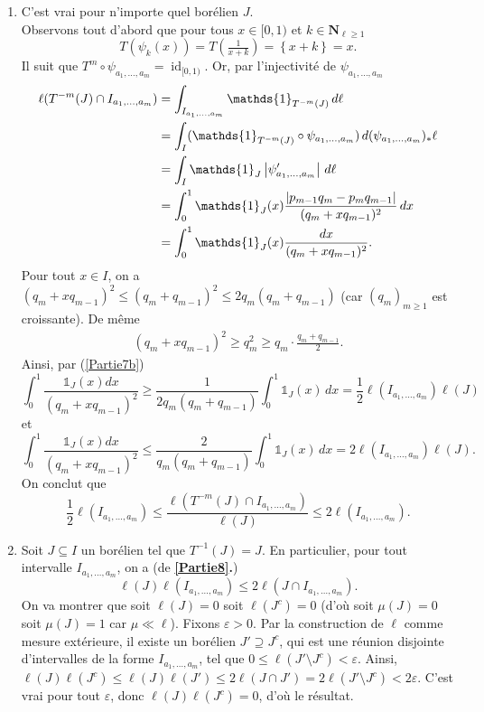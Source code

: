\documentclass[french]{article}
\theoremstyle{definition}
\newcommand{\set}[1]{\left\{#1\right\}}
\newcommand{\tuple}[1]{\left(#1\right)}
\newcommand{\abs}[1]{\left|#1\right|}
\newcommand{\indi}{\mathds{1}}
\newcommand{\Nbb}{\mathbf{N}}
\newcommand{\id}{\operatorname{id}}
\begin{document}
\begin{enumerate}
    \item \label{Partie8}
        C'est vrai pour n'importe quel bor\'elien $J$.\\
        Observons tout d'abord que pour tous $x \in [0,1)$ et $k \in \Nbb_{\ell \ge 1}$
            $$T(\psi_k(x)) = T\tuple{\tfrac{1}{x + k}} = \set{x + k} = x.$$
        Il suit que $T^m \circ \psi_{a_1,\ldots,a_m} = \id_{[0,1)}$. Or, par l'injectivit\'e de $\psi_{a_1,\ldots,a_m}$
            \begin{align*}
                \allowdisplaybreaks
                \ell(T^{-m}(J) \cap I_{a_1,\ldots,a_m}) & = \int_{I_{a_1,\ldots,a_m}} \indi_{T^{-m}(J)}\,d\ell \\
                & = \int_I (\indi_{T^{-m}(J)} \circ \psi_{a_1,\ldots,a_m}) \,d(\psi_{a_1,\ldots,a_m})_\ast \ell \\
                & = \int_I \indi_{J} \abs{\psi'_{a_1,\ldots,a_m}} \,d\ell \\
                & = \int_0^1 \indi_{J}(x) \frac{|p_{m-1}q_m - p_mq_{m-1}|}{(q_m + xq_{m-1})^2}\,dx\\
                & = \int_0^1 \indi_{J}(x) \frac{dx}{(q_m + xq_{m-1})^2}.
            \end{align*}
        Pour tout $x \in I$, on a $(q_m + xq_{m-1})^2 \le (q_m + q_{m-1})^2 \le 2q_m(q_m + q_{m-1})$ (car $(q_m)_{m \ge 1}$ est croissante).
        De m\^eme
            \begin{align*}
                (q_m + xq_{m-1})^2 \ge q_m^2 \ge q_m \cdot \frac{q_m + q_{m-1}}{2}.
            \end{align*}
        Ainsi, par (\ref{Partie7b})
            $$\int_0^1  \frac{\indi_{J}(x) dx}{(q_m + xq_{m-1})^2} \ge \frac{1}{2q_m(q_m + q_{m-1})} \int_0^1 \indi_{J}(x)\,dx = \frac{1}{2}\ell(I_{a_1,\ldots,a_m})\ell(J)$$
        et
            $$\int_0^1  \frac{\indi_{J}(x)dx}{(q_m + xq_{m-1})^2} \le \frac{2}{q_m(q_m + q_{m-1})} \int_0^1 \indi_{J}(x)\,dx = 2\ell(I_{a_1,\ldots,a_m})\ell(J).$$
        On conclut que  
            $$\frac{1}{2}\ell(I_{a_1,\ldots,a_m}) \le \frac{\ell(T^{-m}(J) \cap I_{a_1,\ldots,a_m})}{\ell(J)} \le 2\ell(I_{a_1,\ldots,a_m}).$$

    \item \label{Partie9} Soit $J \subseteq I$ un bor\'elien tel que $T^{-1}(J) = J$. En particulier, pour tout intervalle $I_{a_1,\ldots,a_m}$, on a (de {\bf \ref{Partie8}.})
        $$\ell(J) \ell( I_{a_1,\ldots,a_m}) \le 2\ell(J \cap I_{a_1,\ldots,a_m}).$$
    On va montrer que soit $\ell(J) = 0$ soit $\ell(J^c) = 0$ (d'o\`u soit $\mu(J) = 0$ soit $\mu(J) = 1$ car $\mu \ll \ell$). Fixons $\varepsilon > 0$. Par la construction de $\ell$ comme mesure ext\'erieure, il existe un bor\'elien $J' \supseteq J^c$, qui est une r\'eunion disjointe d'intervalles de la forme $I_{a_1,\ldots,a_m}$, tel que $0 \le \ell(J' \setminus J^c) < \varepsilon$. Ainsi, $\ell(J)\ell(J^c) \le \ell(J)\ell(J') \le 2\ell(J \cap J') = 2\ell(J' \setminus J^c) < 2\varepsilon$. C'est vrai pour tout $\varepsilon$, donc $\ell(J)\ell(J^c) = 0$, d'o\`u le r\'esultat.
\end{enumerate}
\end{document}

